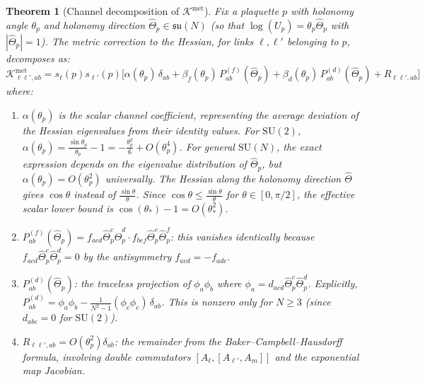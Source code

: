 \documentclass[11pt,a4paper]{article}
\theoremstyle{plain}
\newtheorem{theorem}{Theorem}[section]
\theoremstyle{definition}
\theoremstyle{remark}
\newcommand{\SU}{\mathrm{SU}}
\newcommand{\su}{\mathfrak{su}}
\newcommand{\cK}{\mathcal{K}}
\begin{document}
\begin{theorem}[Channel decomposition of $\cK^{\mathrm{met}}$]\label{thm:channel-decomp}
Fix a plaquette $p$ with holonomy angle $\theta_p$ and holonomy
direction $\hat\Theta_p \in \su(N)$ (so that
$\log(U_p) = \theta_p\hat\Theta_p$ with $|\hat\Theta_p| = 1$).
The metric correction to the Hessian, for links $\ell, \ell'$
belonging to $p$, decomposes as:
\begin{equation}\label{eq:met-decomp}
\cK^{\mathrm{met}}_{\ell\ell',ab}
= s_\ell(p)s_{\ell'}(p)\bigl[
\alpha(\theta_p)\,\delta_{ab}
+ \beta_f(\theta_p)\,P^{(f)}_{ab}(\hat\Theta_p)
+ \beta_d(\theta_p)\,P^{(d)}_{ab}(\hat\Theta_p)
+ R_{\ell\ell',ab}
\bigr]
\end{equation}
where:
\begin{enumerate}[label=(\alph*)]
\item $\alpha(\theta_p)$ is the scalar channel
  coefficient, representing the average deviation of the Hessian
  eigenvalues from their identity values. For $\SU(2)$,
  $\alpha(\theta_p) = \frac{\sin\theta_p}{\theta_p} - 1
  = -\frac{\theta_p^2}{6} + O(\theta_p^4)$. For general
  $\SU(N)$, the exact expression depends on the eigenvalue
  distribution of $\hat\Theta_p$, but $\alpha(\theta_p) = O(\theta_p^2)$
  universally.
  The Hessian along the holonomy direction $\hat\Theta$ gives
  $\cos\theta$ instead of $\frac{\sin\theta}{\theta}$.
  Since $\cos\theta \leq \frac{\sin\theta}{\theta}$
  for $\theta \in [0,\pi/2]$, the effective scalar lower bound
  is $\cos(\theta_*) - 1 = O(\theta_*^2)$.
\item $P^{(f)}_{ab}(\hat\Theta_p)
  = f_{acd}\hat\Theta_p^c\hat\Theta_p^d\cdot f_{bef}
  \hat\Theta_p^e\hat\Theta_p^f$: this vanishes identically
  because $f_{acd}\hat\Theta_p^c\hat\Theta_p^d = 0$ by the
  antisymmetry $f_{acd} = -f_{adc}$.
\item $P^{(d)}_{ab}(\hat\Theta_p)$: the traceless projection of
  $\phi_a\phi_b$ where $\phi_a = d_{acd}\hat\Theta_p^c\hat\Theta_p^d$.
  Explicitly,
  $P^{(d)}_{ab} = \phi_a\phi_b
  - \frac{1}{N^2-1}(\phi_c\phi_c)\,\delta_{ab}$.
  This is nonzero only for $N \geq 3$ (since $d_{abc} = 0$
  for $\SU(2)$).
\item $R_{\ell\ell',ab} = O(\theta_p^2)\delta_{ab}$: the
  remainder from the Baker--Campbell--Hausdorff formula, involving
  double commutators $[A_\ell,[A_{\ell'},A_m]]$ and the
  exponential map Jacobian.
\end{enumerate}
\end{theorem}
\end{document}
